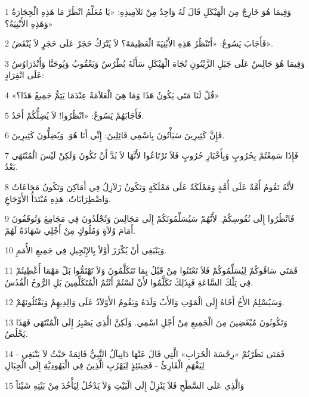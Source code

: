 \par 1 وَفِيمَا هُوَ خَارِجٌ مِنَ الْهَيْكَلِ قَالَ لَهُ وَاحِدٌ مِنْ تَلاَمِيذِهِ: «يَا مُعَلِّمُ انْظُرْ مَا هَذِهِ الْحِجَارَةُ وَهَذِهِ الأَبْنِيَةُ؟»
\par 2 فَأَجَابَ يَسُوعُ: «أَتَنْظُرُ هَذِهِ الأَبْنِيَةَ الْعَظِيمَةَ؟ لاَ يُتْرَكُ حَجَرٌ عَلَى حَجَرٍ لاَ يُنْقَضُ».
\par 3 وَفِيمَا هُوَ جَالِسٌ عَلَى جَبَلِ الزَّيْتُونِ تُجَاهَ الْهَيْكَلِ سَأَلَهُ بُطْرُسُ وَيَعْقُوبُ وَيُوحَنَّا وَأَنْدَرَاوُسُ عَلَى انْفِرَادٍ:
\par 4 «قُلْ لَنَا مَتَى يَكُونُ هَذَا وَمَا هِيَ الْعَلاَمَةُ عِنْدَمَا يَتِمُّ جَمِيعُ هَذَا؟»
\par 5 فَأَجَابَهُمْ يَسُوعُ: «انْظُرُوا! لاَ يُضِلُّكُمْ أَحَدٌ.
\par 6 فَإِنَّ كَثِيرِينَ سَيَأْتُونَ بِاسْمِي قَائِلِينَ: إِنِّي أَنَا هُوَ. وَيُضِلُّونَ كَثِيرِينَ.
\par 7 فَإِذَا سَمِعْتُمْ بِحُرُوبٍ وَبِأَخْبَارِ حُرُوبٍ فَلاَ تَرْتَاعُوا لأَنَّهَا لاَ بُدَّ أَنْ تَكُونَ وَلَكِنْ لَيْسَ الْمُنْتَهَى بَعْدُ.
\par 8 لأَنَّهُ تَقُومُ أُمَّةٌ عَلَى أُمَّةٍ وَمَمْلَكَةٌ عَلَى مَمْلَكَةٍ وَتَكُونُ زَلاَزِلُ فِي أَمَاكِنَ وَتَكُونُ مَجَاعَاتٌ وَاضْطِرَابَاتٌ. هَذِهِ مُبْتَدَأُ الأَوْجَاعِ.
\par 9 فَانْظُرُوا إِلَى نُفُوسِكُمْ. لأَنَّهُمْ سَيُسَلِّمُونَكُمْ إِلَى مَجَالِسَ وَتُجْلَدُونَ فِي مَجَامِعَ وَتُوقَفُونَ أَمَامَ وُلاَةٍ وَمُلُوكٍ مِنْ أَجْلِي شَهَادَةً لَهُمْ.
\par 10 وَيَنْبَغِي أَنْ يُكْرَزَ أَوَّلاً بِالإِنْجِيلِ فِي جَمِيعِ الأُمَمِ.
\par 11 فَمَتَى سَاقُوكُمْ لِيُسَلِّمُوكُمْ فَلاَ تَعْتَنُوا مِنْ قَبْلُ بِمَا تَتَكَلَّمُونَ وَلاَ تَهْتَمُّوا بَلْ مَهْمَا أُعْطِيتُمْ فِي تِلْكَ السَّاعَةِ فَبِذَلِكَ تَكَلَّمُوا لأَنْ لَسْتُمْ أَنْتُمُ الْمُتَكَلِّمِينَ بَلِ الرُّوحُ الْقُدُسُ.
\par 12 وَسَيُسْلِمُ الأَخُ أَخَاهُ إِلَى الْمَوْتِ وَالأَبُ وَلَدَهُ وَيَقُومُ الأَوْلاَدُ عَلَى وَالِدِيهِمْ وَيَقْتُلُونَهُمْ.
\par 13 وَتَكُونُونَ مُبْغَضِينَ مِنَ الْجَمِيعِ مِنْ أَجْلِ اسْمِي. وَلَكِنَّ الَّذِي يَصْبِرُ إِلَى الْمُنْتَهَى فَهَذَا يَخْلُصُ.
\par 14 فَمَتَى نَظَرْتُمْ «رِجْسَةَ الْخَرَابِ» الَّتِي قَالَ عَنْهَا دَانِيآلُ النَّبِيُّ قَائِمَةً حَيْثُ لاَ يَنْبَغِي - لِيَفْهَمِ الْقَارِئُ - فَحِينَئِذٍ لِيَهْرُبِ الَّذِينَ فِي الْيَهُودِيَّةِ إِلَى الْجِبَالِ
\par 15 وَالَّذِي عَلَى السَّطْحِ فَلاَ يَنْزِلْ إِلَى الْبَيْتِ وَلاَ يَدْخُلْ لِيَأْخُذَ مِنْ بَيْتِهِ شَيْئاً
